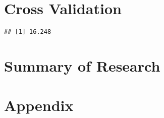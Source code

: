 \documentclass[
]{article}
\newenvironment{Shaded}{\begin{snugshade}}{\end{snugshade}}
\newcommand{\AttributeTok}[1]{\textcolor[rgb]{0.13,0.29,0.53}{#1}}
\newcommand{\DecValTok}[1]{\textcolor[rgb]{0.00,0.00,0.81}{#1}}
\newcommand{\FunctionTok}[1]{\textcolor[rgb]{0.13,0.29,0.53}{\textbf{#1}}}
\newcommand{\NormalTok}[1]{#1}
\newcommand{\OtherTok}[1]{\textcolor[rgb]{0.56,0.35,0.01}{#1}}
\newcommand{\SpecialCharTok}[1]{\textcolor[rgb]{0.81,0.36,0.00}{\textbf{#1}}}
\begin{document}
\section{Cross Validation}\label{cross-validation}

\begin{Shaded}
\end{Shaded}

\begin{verbatim}
## [1] 16.248
\end{verbatim}

\section{Summary of Research}\label{summary-of-research}

\section{Appendix}\label{appendix}
\end{document}
